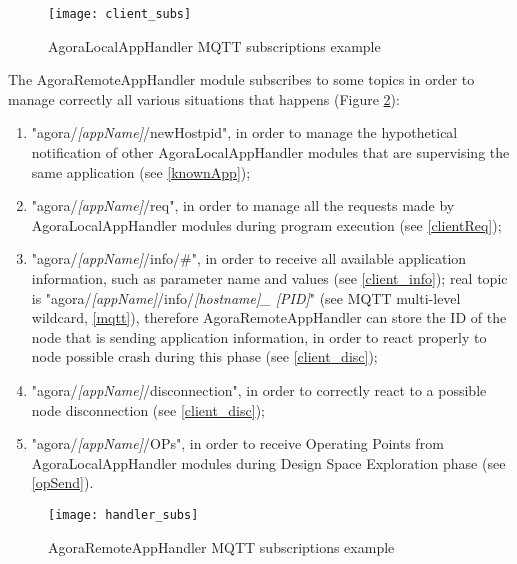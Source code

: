 \begin{figure}[t]

    \centering
    \texttt{[image: client\_subs]}
    \caption{AgoraLocalAppHandler MQTT subscriptions example}

    \label{fig::localSubs}
    
\end{figure}

The AgoraRemoteAppHandler module subscribes to some topics in order to manage correctly all various situations that happens (Figure \ref{fig::remotSubs}):

\begin{enumerate}

    \item "agora/\textit{[appName]}/newHostpid", in order to manage the hypothetical notification of other AgoraLocalAppHandler modules that are supervising the same application (see \ref{knownApp});
    
    \item "agora/\textit{[appName]}/req", in order to manage all the requests made by AgoraLocalAppHandler modules during program execution (see \ref{clientReq});
    
    \item "agora/\textit{[appName]}/info/\#", in order to receive all available application information, such as parameter name and values (see \ref{client_info}); real topic is "agora\slash{}\textit{[appName]}\slash{}info\slash{}\textit{[host\-name]\_ [PID]}" (see MQTT multi-level wildcard, \ref{mqtt}), therefore Agora\-Remote\-App\-Handler can store the ID of the node that is sending application information, in order to react properly to node possible crash during this phase (see \ref{client_disc});
    
    \item "agora/\textit{[appName]}/disconnection", in order to correctly react to a possible node disconnection (see \ref{client_disc});
    
    \item "agora/\textit{[appName]}/OPs", in order to receive Operating Points from AgoraLocalAppHandler modules during Design Space Exploration phase (see \ref{opSend}).

\end{enumerate}

\begin{figure}[t]

    \centering
    \texttt{[image: handler\_subs]}
    \caption{AgoraRemoteAppHandler MQTT subscriptions example}

    \label{fig::remotSubs}
    
\end{figure}


